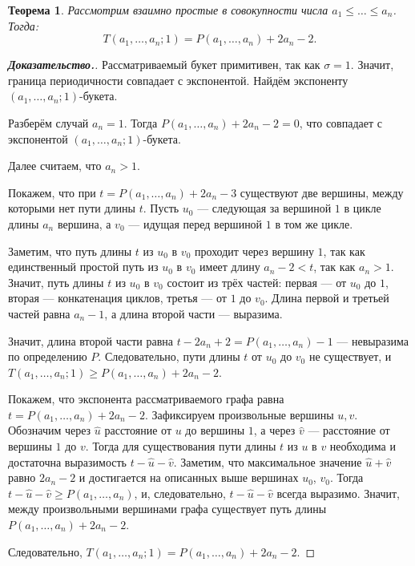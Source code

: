 \documentclass[12pt]{article}
\newtheorem{theorem}{Теорема}[section]
\theoremstyle{definition}
\begin{document}
\begin{theorem}
\label{thTP}
Рассмотрим взаимно простые в совокупности числа $a_1 \le \dots \le a_n$. Тогда: 
\begin{equation*}
T(a_1, \dots, a_n; 1) = P(a_1, \dots, a_n) + 2a_n - 2.
\end{equation*}
\end{theorem}
\begin{proof}[\textbf{Доказательство.}]
Рассматриваемый букет примитивен, так как $\sigma = 1$. Значит, граница периодичности совпадает с экспонентой. Найдём экспоненту $(a_1, \dots, a_n; 1)$-букета.

Разберём случай $a_n = 1$. Тогда $P(a_1, \dots, a_n) + 2a_n - 2 = 0$, что совпадает с экспонентой $(a_1, \dots, a_n; 1)$-букета.

Далее считаем, что $a_n > 1$.

Покажем, что при $t = P(a_1, \dots, a_n) + 2a_n - 3$ существуют две вершины, между которыми нет пути длины $t$. Пусть $u_0$ --- следующая за вершиной $1$ в цикле длины $a_n$ вершина, а $v_0$ --- идущая перед вершиной $1$ в том же цикле.

Заметим, что путь длины $t$ из $u_0$ в $v_0$ проходит через вершину $1$, так как единственный простой путь из $u_0$ в $v_0$ имеет длину $a_n - 2 < t$, так как $a_n > 1$. Значит, путь длины $t$ из $u_0$ в $v_0$ состоит из трёх частей: первая --- от $u_0$ до $1$, вторая --- конкатенация циклов, третья --- от $1$ до $v_0$. Длина первой и третьей частей равна $a_n - 1$, а длина второй части --- выразима. 

Значит, длина второй части равна $t - 2a_n + 2 = P(a_1, \dots, a_n) - 1$ --- невыразима по определению $P$. Следовательно, пути длины $t$ от $u_0$ до $v_0$ не существует, и $T(a_1, \dots, a_n; 1) \ge P(a_1, \dots, a_n) + 2a_n - 2$.

Покажем, что экспонента рассматриваемого графа равна $t = P(a_1, \dots, a_n) + 2a_n - 2$. Зафиксируем произвольные вершины $u, v$. Обозначим через $\hat{u}$ расстояние от $u$ до вершины $1$, а через $\hat{v}$ --- расстояние от вершины $1$ до $v$. Тогда для существования пути длины $t$ из $u$ в $v$ необходима и достаточна выразимость $t - \hat{u} - \hat{v}$. Заметим, что максимальное значение $\hat{u} + \hat{v}$ равно $2a_n - 2$ и достигается на описанных выше вершинах $u_0$, $v_0$. Тогда $t - \hat{u} - \hat{v} \ge P(a_1, \dots, a_n)$, и, следовательно, $t - \hat{u} - \hat{v}$ всегда выразимо. Значит, между произвольными вершинами графа существует путь длины $P(a_1, \dots, a_n) + 2a_n - 2$.

Следовательно, $T(a_1, \dots, a_n; 1) = P(a_1, \dots, a_n) + 2a_n - 2$.
\end{proof}
\end{document}
